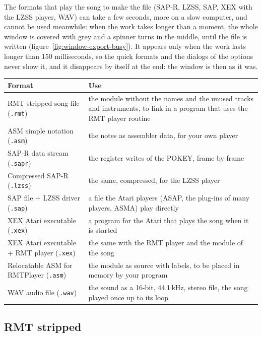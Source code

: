 The formats that play the song to make the file (SAP-R, LZSS, SAP, XEX with the LZSS player, WAV) can take a few seconds, more on a
slow computer, and \RITMO{} cannot be used meanwhile: when the work takes longer than a moment, the whole window is covered with grey
and a spinner turns in the middle, until the file is written (figure~\ref{fig:window-export-busy}). It appears only when the work lasts
longer than 150 milliseconds, so the quick formats and the dialogs of the options never show it, and it disappears by itself at the
end: the window is then as it was.


\begin{center}
\begin{tabular}{@{}>{\raggedright\arraybackslash}p{4.2cm}p{9.6cm}@{}}
\toprule
Format & Use \\ \midrule
RMT stripped song file (\texttt{.rmt}) & the module without the names and the unused tracks and instruments, to link in a program that uses
  the RMT player routine \\
ASM simple notation (\texttt{.asm}) & the notes as assembler data, for your own player \\
SAP-R data stream (\texttt{.sapr}) & the register writes of the POKEY, frame by frame \\
Compressed SAP-R (\texttt{.lzss}) & the same, compressed, for the LZSS player \\
SAP file + LZSS driver (\texttt{.sap}) & a file the Atari players (ASAP, the plug-ins of many players, ASMA) play directly \\
XEX Atari executable (\texttt{.xex}) & a program for the Atari that plays the song when it is started \\
XEX Atari executable + RMT player (\texttt{.xex}) & the same with the RMT player and the module of the song \\
Relocatable ASM for RMTPlayer (\texttt{.asm}) & the module as source with labels, to be placed in memory by your program \\
WAV audio file (\texttt{.wav}) & the sound as a 16-bit, 44.1\,kHz, stereo file, the song played once up to its loop \\
\bottomrule
\end{tabular}
\end{center}

\subsection{RMT stripped}

